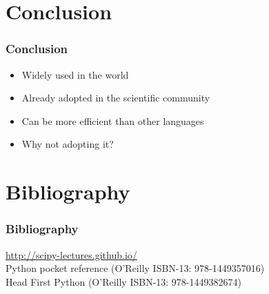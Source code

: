 \documentclass[14pt]{beamer}
\begin{document}
\section{Conclusion}
\begin{frame}
\frametitle{Conclusion}
\begin{itemize}
\item Widely used in the world
\item Already adopted in the scientific community
\item Can be more efficient than other languages
\item \alert{Why not adopting it?}
\end{itemize}
\end{frame}

\appendix
\section{Bibliography}

\begin{frame}
\frametitle{Bibliography}
\url{http://scipy-lectures.github.io/}\\
Python pocket reference (O'Reilly ISBN-13: 978-1449357016)\\
Head First Python (O'Reilly ISBN-13: 978-1449382674)
\end{frame}
\end{document}
